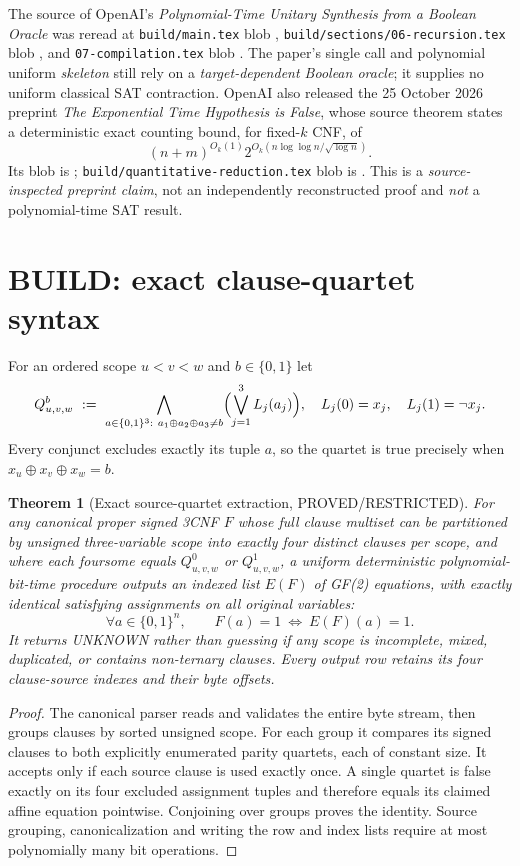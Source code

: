 \documentclass[11pt]{article}
\newtheorem{theorem}{Theorem}
\begin{document}
The source of OpenAI's \emph{Polynomial-Time Unitary Synthesis from a Boolean
Oracle} was reread at \texttt{build/main.tex} blob
{\ttfamily{}},
\texttt{build/sections/06-recursion.tex} blob
{\ttfamily{}}, and
\texttt{07-compilation.tex} blob
{\ttfamily{}}.  The paper's
single call and polynomial uniform \emph{skeleton} still rely on a
\emph{target-dependent Boolean oracle}; it supplies no uniform classical
SAT contraction.  OpenAI also released the 25 October 2026 preprint
\emph{The Exponential Time Hypothesis is False}, whose source theorem states
a deterministic exact counting bound, for fixed-$k$ CNF, of
\[ (n+m)^{O_k(1)}2^{O_k(n\log\log n/\sqrt{\log n})}. \]
Its  blob is
{\ttfamily{}};
\texttt{build/quantitative-reduction.tex} blob is
{\ttfamily{}}.  This is a
\emph{source-inspected preprint claim}, not an independently reconstructed
proof and \emph{not} a polynomial-time SAT result.

\section{BUILD: exact clause-quartet syntax}
For an ordered scope $u<v<w$ and $b\in\{0,1\}$ let
\[
 Q_{u,v,w}^b\ :=\ \bigwedge_{a\in\{0,1\}^3:\ a_1\oplus a_2\oplus a_3\ne b}
\Bigl(\bigvee_{j=1}^3 L_j(a_j)\Bigr),\quad
L_j(0)=x_j,\quad L_j(1)=\neg x_j.
\]
Every conjunct excludes exactly its tuple $a$, so the quartet is true
precisely when $x_u\oplus x_v\oplus x_w=b$.

\begin{theorem}[Exact source-quartet extraction, PROVED/RESTRICTED]
For any canonical proper signed 3CNF $F$ whose full clause multiset
can be partitioned by unsigned three-variable scope into exactly four
\emph{distinct} clauses per scope, and where each foursome equals
$Q_{u,v,w}^0$ or $Q_{u,v,w}^1$, a uniform deterministic polynomial-bit-time
procedure outputs an indexed list $E(F)$ of GF(2) equations, with exactly
identical satisfying assignments on all original variables:
\[
 \forall a\in\{0,1\}^{n},\qquad F(a)=1\ \Longleftrightarrow\ E(F)(a)=1.
\]
It returns UNKNOWN rather than guessing if any scope is incomplete, mixed,
duplicated, or contains non-ternary clauses.  Every output row retains its
four clause-source indexes and their byte offsets.
\end{theorem}
\begin{proof}
The canonical parser reads and validates the entire byte stream, then groups
clauses by sorted unsigned scope.  For each group it compares its signed
clauses to both explicitly enumerated parity quartets, each of constant size.
It accepts only if each source clause is used exactly once.  A single quartet
is false exactly on its four excluded assignment tuples and therefore equals
its claimed affine equation pointwise.  Conjoining over groups proves the
identity.  Source grouping, canonicalization and writing the row and index
lists require at most polynomially many bit operations.
\end{proof}
\end{document}
